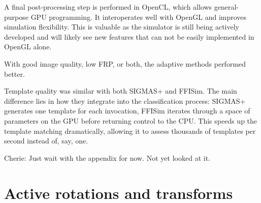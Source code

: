 A final post-processing step is performed in OpenCL, which allows general-purpose GPU programming. It interoperates well with OpenGL and improves simulation flexibility. This is valuable as the simulator is still being actively developed and will likely see new features that can not be easily implemented in OpenGL alone.

With good image quality, low FRP, or both, the adaptive methods performed better.


Template quality was similar with both SIGMAS+ and FFISim. The main difference lies in how they integrate into the classification process: SIGMAS+ generates one template for each invocation, FFISim iterates through a space of parameters on the GPU before returning control to the CPU. This speeds up the template matching dramatically, allowing it to assess thousands of templates per second instead of, say, one. 
 
%

\ifPhdDoc
\clearpage
\appendix
\renewcommand\thesection{\Roman{section}}
\else
\appendices
\fi

{\color{blue}Cherie: Just wait with the appendix for now. Not yet looked at it.}

\section{Active rotations and transforms}\label{IV_active_rotations_transforms} 

